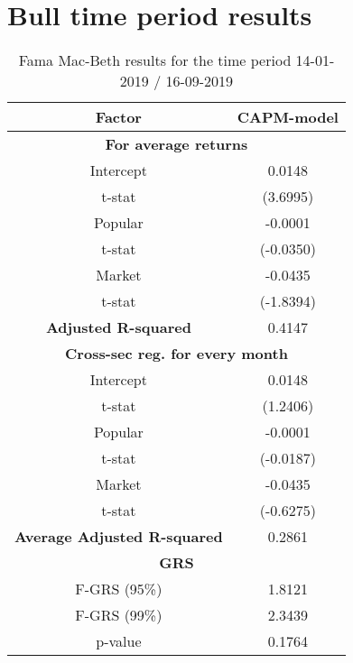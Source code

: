 \section{Bull time period results}
\label{app: bull-res}

\begin{table}[h!]
	\centering
	\captionsetup{skip=0.5\baselineskip}
	\caption{Fama Mac-Beth results for the time period 14-01-2019 / 16-09-2019}
	\begin{tabular}{|c|c|}
		\hline
		\textbf{Factor} & \textbf{CAPM-model} \\ \hline
		\multicolumn{2}{|c|}{\textbf{For average returns}} \\ \hline
		Intercept & 0.0148 \\ 
		t-stat & (3.6995) \\ \hline
		Popular & -0.0001 \\ 
		t-stat & (-0.0350)\\ \hline
		Market & -0.0435 \\
		t-stat & (-1.8394)\\ \hline
		\textbf{Adjusted R-squared} & 0.4147 \\ \hline
		\multicolumn{2}{|c|}{\textbf{Cross-sec reg. for every month}} \\ \hline
		Intercept & 0.0148 \\ 
		t-stat & (1.2406) \\ \hline
		Popular & -0.0001 \\ 
		t-stat & (-0.0187)\\ \hline
		Market & -0.0435 \\
		t-stat & (-0.6275)\\ \hline
		\textbf{Average Adjusted R-squared} & 0.2861 \\ \hline
		\multicolumn{2}{|c|}{\textbf{GRS}} \\ \hline
		F-GRS (95\%) & 1.8121 \\ \hline
		F-GRS (99\%) & 2.3439 \\ \hline
		p-value & 0.1764 \\ \hline
	\end{tabular}
\end{table}

